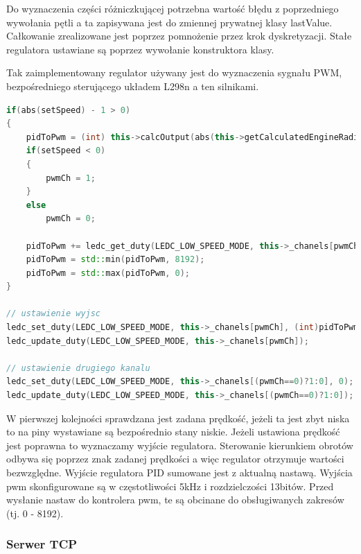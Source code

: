 Do wyznaczenia części różniczkującej potrzebna wartość błędu z poprzedniego wywołania pętli a ta zapisywana jest do zmiennej prywatnej klasy lastValue. 
Całkowanie zrealizowane jest poprzez pomnożenie przez krok dyskretyzacji. Stałe regulatora ustawiane są poprzez wywołanie konstruktora klasy.

Tak zaimplementowany regulator używany jest do wyznaczenia sygnału PWM, bezpośredniego sterującego układem L298n a ten silnikami. 

\begin{lstlisting}[language=C++,caption=Wyznaczenie modulacji PWM,label={kodCPPPWM}]
if(abs(setSpeed) - 1 > 0)
{
	pidToPwm = (int) this->calcOutput(abs(this->getCalculatedEngineRadialSpeed()), abs(setSpeed));
	if(setSpeed < 0)
	{
		pwmCh = 1;
	}
	else
		pwmCh = 0;

	pidToPwm += ledc_get_duty(LEDC_LOW_SPEED_MODE, this->_chanels[pwmCh]);
	pidToPwm = std::min(pidToPwm, 8192);
	pidToPwm = std::max(pidToPwm, 0);
}

// ustawienie wyjsc
ledc_set_duty(LEDC_LOW_SPEED_MODE, this->_chanels[pwmCh], (int)pidToPwm);
ledc_update_duty(LEDC_LOW_SPEED_MODE, this->_chanels[pwmCh]);

// ustawienie drugiego kanalu
ledc_set_duty(LEDC_LOW_SPEED_MODE, this->_chanels[(pwmCh==0)?1:0], 0);
ledc_update_duty(LEDC_LOW_SPEED_MODE, this->_chanels[(pwmCh==0)?1:0]);
\end{lstlisting}

W pierwszej kolejności sprawdzana jest zadana prędkość, jeżeli ta jest zbyt niska to na piny wystawiane są bezpośrednio stany niskie.
Jeżeli ustawiona prędkość jest poprawna to wyznaczamy wyjście regulatora. Sterowanie kierunkiem obrotów odbywa 
się poprzez znak zadanej prędkości a więc regulator otrzymuje wartości bezwzględne. 
Wyjście regulatora PID sumowane jest z aktualną nastawą. Wyjścia pwm skonfigurowane są w częstotliwości 5kHz i rozdzielczości 13bitów. 
Przed wysłanie nastaw do kontrolera pwm, te są obcinane do obsługiwanych zakresów (tj. 0 - 8192).

\subsubsection{Serwer TCP}


